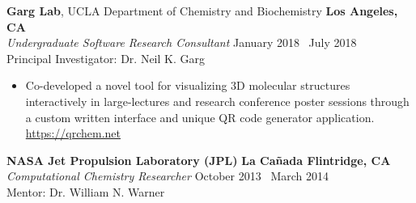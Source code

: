 {\bf Garg Lab}, UCLA Department of Chemistry and Biochemistry \hfill {\bf Los Angeles, CA} \\
{\it Undergraduate Software Research Consultant} \hfill January 2018 \textendash\ July 2018 \\
Principal Investigator: Dr. Neil K. Garg
\begin{itemize} \itemsep -2pt
	\item Co-developed a novel tool for visualizing 3D molecular structures interactively in large-lectures and research conference poster sessions through a custom written interface and unique QR code generator application. \\ \textcolor{RoyalBlue}{\href{https://qrchem.net}{https://qrchem.net}}
\end{itemize}

{\bf NASA Jet Propulsion Laboratory (JPL)} \hfill {\bf La Cañada Flintridge, CA} \\
{\it Computational Chemistry Researcher} \hfill October 2013 \textendash\ March 2014 \\
Mentor: Dr. William N. Warner \\